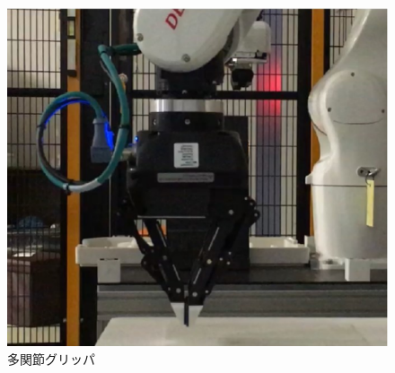 \begin{figure}[h]
 \begin{center}
  \includegraphics[scale=0.4]{../fig/eps/robotiq.eps}
 \caption{多関節グリッパ}
  \label{fig::robotiq}
 \end{center}
\end{figure}



